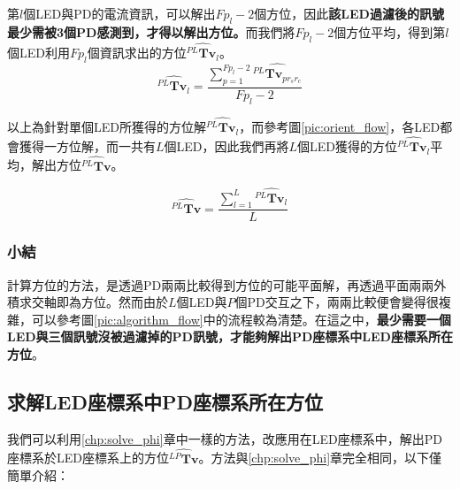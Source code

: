 
        第$l$個LED與PD的電流資訊，可以解出$Fp_l-2$個方位，因此\textbf{該LED過濾後的訊號最少需被3個PD感測到，才得以解出方位。}而我們將$Fp_l-2$個方位平均，得到第$l$個LED利用$Fp_l$個資訊求出的方位$\hat{{^{PL}\boldsymbol{Tv}}_{l}}$。
        \begin{equation}
            \label{eqn:average_orient_led}
            \hat{{^{PL}\boldsymbol{Tv}}_{l}} = \frac{\sum^{Fp_l-2}_{p=1}\hat{{^{PL}\boldsymbol{Tv}}_{p{r_sr_c}}}}{Fp_l-2}
        \end{equation}

        以上為針對單個LED所獲得的方位解$\hat{{^{PL}\boldsymbol{Tv}}_{l}}$，而參考圖\ref{pic:orient_flow}，各LED都會獲得一方位解，而一共有$L$個LED，因此我們再將$L$個LED獲得的方位$\hat{{^{PL}\boldsymbol{Tv}}_{l}}$平均，解出方位$\hat{{^{PL}\boldsymbol{Tv}}}$。

        \begin{equation}
            \label{eqn:average_orient}
            \hat{{^{PL}\boldsymbol{Tv}}} = \frac{\sum^{L}_{l=1}\hat{{^{PL}\boldsymbol{Tv}}_{l}}}{L}
        \end{equation}
        
        
    \subsubsection{小結}
    \label{chp:orient_conclu}

    計算方位的方法，是透過PD兩兩比較得到方位的可能平面解，再透過平面兩兩外積求交軸即為方位。然而由於$L$個LED與$P$個PD交互之下，兩兩比較便會變得很複雜，可以參考圖\ref{pic:algorithm_flow}中的流程較為清楚。在這之中，\textbf{最少需要一個LED與三個訊號沒被過濾掉的PD訊號，才能夠解出PD座標系中LED座標系所在方位}。

        
    \subsection{求解LED座標系中PD座標系所在方位}
    \label{chp:solve_theta}

    我們可以利用\ref{chp:solve_phi}章中一樣的方法，改應用在LED座標系中，解出PD座標系於LED座標系上的方位$\hat{{^{LP}\boldsymbol{Tv}}}$。方法與\ref{chp:solve_phi}章完全相同，以下僅簡單介紹：

